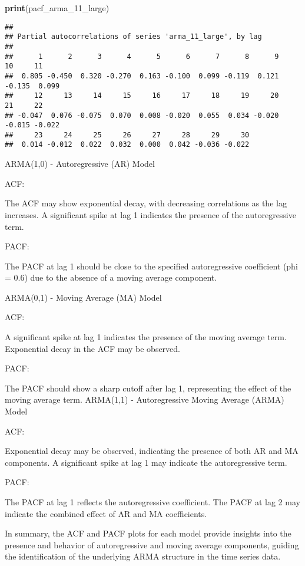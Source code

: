 \documentclass[
]{article}
\newenvironment{Shaded}{\begin{snugshade}}{\end{snugshade}}
\newcommand{\FunctionTok}[1]{\textcolor[rgb]{0.13,0.29,0.53}{\textbf{#1}}}
\newcommand{\NormalTok}[1]{#1}
\begin{document}
\begin{Shaded}
\begin{Highlighting}[]
\FunctionTok{print}\NormalTok{(pacf\_arma\_11\_large)}
\end{Highlighting}
\end{Shaded}

\begin{verbatim}
## 
## Partial autocorrelations of series 'arma_11_large', by lag
## 
##      1      2      3      4      5      6      7      8      9     10     11 
##  0.805 -0.450  0.320 -0.270  0.163 -0.100  0.099 -0.119  0.121 -0.135  0.099 
##     12     13     14     15     16     17     18     19     20     21     22 
## -0.047  0.076 -0.075  0.070  0.008 -0.020  0.055  0.034 -0.020 -0.015 -0.022 
##     23     24     25     26     27     28     29     30 
##  0.014 -0.012  0.022  0.032  0.000  0.042 -0.036 -0.022
\end{verbatim}

ARMA(1,0) - Autoregressive (AR) Model

ACF:

The ACF may show exponential decay, with decreasing correlations as the
lag increases. A significant spike at lag 1 indicates the presence of
the autoregressive term.

PACF:

The PACF at lag 1 should be close to the specified autoregressive
coefficient (phi = 0.6) due to the absence of a moving average
component.

ARMA(0,1) - Moving Average (MA) Model

ACF:

A significant spike at lag 1 indicates the presence of the moving
average term. Exponential decay in the ACF may be observed.

PACF:

The PACF should show a sharp cutoff after lag 1, representing the effect
of the moving average term. ARMA(1,1) - Autoregressive Moving Average
(ARMA) Model

ACF:

Exponential decay may be observed, indicating the presence of both AR
and MA components. A significant spike at lag 1 may indicate the
autoregressive term.

PACF:

The PACF at lag 1 reflects the autoregressive coefficient. The PACF at
lag 2 may indicate the combined effect of AR and MA coefficients.

In summary, the ACF and PACF plots for each model provide insights into
the presence and behavior of autoregressive and moving average
components, guiding the identification of the underlying ARMA structure
in the time series data.
\end{document}
